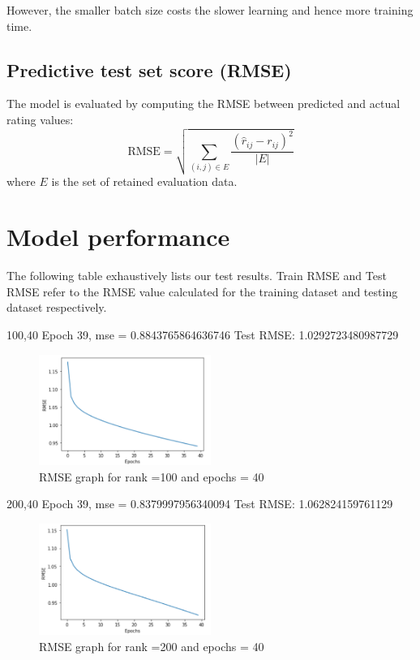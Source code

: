 \documentclass[final]{cvpr}
\begin{document}
However, the smaller batch size costs the slower learning and hence more training time.

\subsection{Predictive test set score (RMSE)}
The model is evaluated by computing the RMSE between predicted and actual rating values:
$$ \text{RMSE} = \sqrt{\sum_{(i, j) \in E} \frac{{(\hat r_{ij} - r_{ij})}^2}{\left| E \right|}} $$
where $E$ is the set of retained evaluation data.

\section{Model performance}
The following table exhaustively lists our test results. Train RMSE and Test RMSE refer to the RMSE value calculated for the training dataset and testing dataset respectively.

100,40
Epoch 39, mse = 0.8843765864636746
Test RMSE: 1.0292723480987729

\begin{figure}[h]
	\includegraphics[width=0.5\textwidth]{./100_40_graph.PNG}
	\caption{RMSE graph for rank =100 and epochs = 40}
\end{figure}

200,40
Epoch 39, mse = 0.8379997956340094
Test RMSE: 1.062824159761129

\begin{figure}[h]
	\includegraphics[width=0.5\textwidth]{./200_40_graph.PNG}
	\caption{RMSE graph for rank =200 and epochs = 40}
\end{figure}
\end{document}
